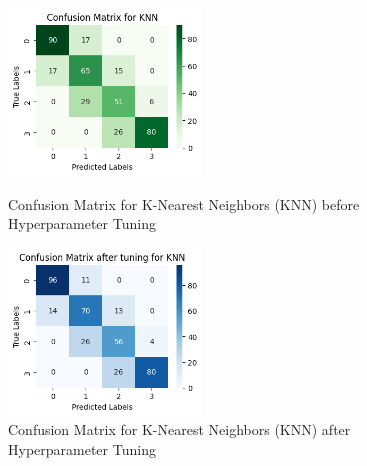 \documentclass[12pt]{report}
\begin{document}
\begin{figure}[H]
    \centering
		\begin{minipage}{0.45\textwidth}
			\centering
			\includegraphics[height=12em]{cmat_KNN.png}
			\caption{Confusion Matrix for K-Nearest Neighbors (KNN) before Hyperparameter Tuning}
			\label{cmat_KNN}
		\end{minipage}
    \hfill
    \begin{minipage}{0.45\textwidth}
        \centering
        \includegraphics[height=12em]{cmat_tuned_KNN.png}
        \caption{Confusion Matrix for K-Nearest Neighbors (KNN) after Hyperparameter Tuning}
        \label{cmat_tuned_KNN}
    \end{minipage}
    
\end{figure}
\end{document}
